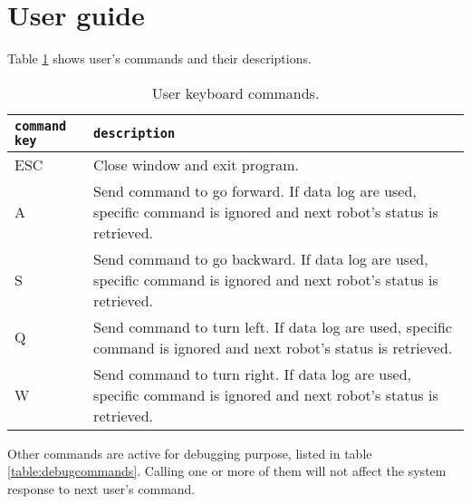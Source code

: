 \section{User guide}
\label{sourcecode:userguide}

Table \ref{table:usercommands} shows user's commands and their descriptions.

\begin{table}[!h]
  \centering  
  \begin{tabular}{| l | l |}

    \hline
    \texttt{command key} &
    \texttt{description} \\

    \hline
    \small {ESC} &
    \parbox[t]{9cm}{\raggedright \small
      Close window and exit program.} \\  [1ex]

    \hline
    \small {A} &
    \parbox[t]{9cm}{\raggedright \small
      Send command to go forward. If data log are used, specific command is ignored
      and next robot's status is retrieved.} \\  [1ex]

    \hline
    \small {S} &
    \parbox[t]{9cm}{\raggedright \small
      Send command to go backward. If data log are used, specific command is ignored
      and next robot's status is retrieved.} \\  [1ex]

    \hline
    \small {Q} &
    \parbox[t]{9cm}{\raggedright \small
      Send command to turn left. If data log are used, specific command is ignored
      and next robot's status is retrieved.} \\  [1ex]

    \hline
    \small {W} &
    \parbox[t]{9cm}{\raggedright \small
      Send command to turn right. If data log are used, specific command is ignored
      and next robot's status is retrieved.} \\  [1ex]

    \hline

  \end{tabular}
  \caption{User keyboard commands.}
  \label{table:usercommands}
\end{table}

Other commands are active for debugging purpose, listed
in table \ref{table:debugcommands}. Calling one or more of
them will not affect the system response to next
user's command.

